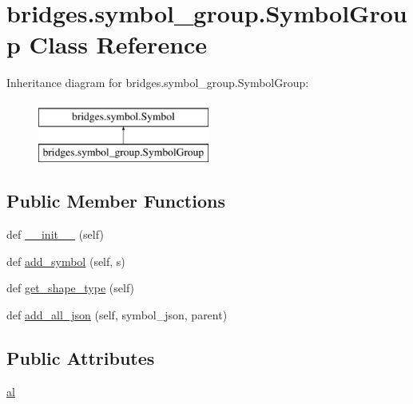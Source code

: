 \hypertarget{classbridges_1_1symbol__group_1_1_symbol_group}{}\section{bridges.\+symbol\+\_\+group.\+Symbol\+Group Class Reference}
\label{classbridges_1_1symbol__group_1_1_symbol_group}
Inheritance diagram for bridges.\+symbol\+\_\+group.\+Symbol\+Group\+:\begin{figure}[H]
\begin{center}
\leavevmode
\includegraphics[height=2.000000cm]{classbridges_1_1symbol__group_1_1_symbol_group}
\end{center}
\end{figure}
\subsection*{Public Member Functions}
\begin{DoxyCompactItemize}
\item 
def \hyperlink{classbridges_1_1symbol__group_1_1_symbol_group_a36a18db3801989b53d43417e6eab9760}{\+\_\+\+\_\+init\+\_\+\+\_\+} (self)
\item 
def \hyperlink{classbridges_1_1symbol__group_1_1_symbol_group_a0a8071d7599e8e657cb94d35a82ac826}{add\+\_\+symbol} (self, s)
\item 
def \hyperlink{classbridges_1_1symbol__group_1_1_symbol_group_a76e677be6babb261ee08d86aa69aa81a}{get\+\_\+shape\+\_\+type} (self)
\item 
def \hyperlink{classbridges_1_1symbol__group_1_1_symbol_group_ab88179337648107fab5f2e9f17f52718}{add\+\_\+all\+\_\+json} (self, symbol\+\_\+json, parent)
\end{DoxyCompactItemize}
\subsection*{Public Attributes}
\begin{DoxyCompactItemize}
\item 
\hyperlink{classbridges_1_1symbol__group_1_1_symbol_group_ac5822f8a316fc16fff7f1b1e5421bde8}{al}
\end{DoxyCompactItemize}


